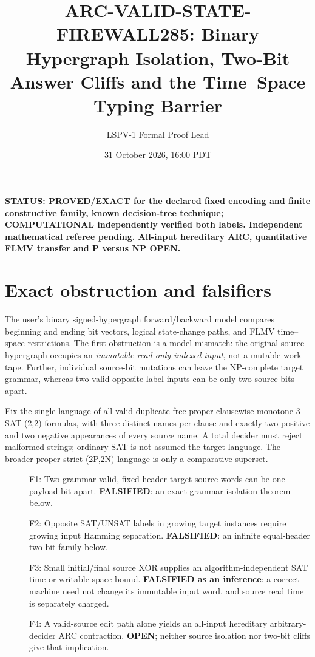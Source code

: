 \documentclass[11pt]{article}
\title{ARC-VALID-STATE-FIREWALL285: Binary Hypergraph Isolation, Two-Bit Answer Cliffs and the Time--Space Typing Barrier}
\author{LSPV-1 Formal Proof Lead}
\date{31 October 2026, 16:00 PDT}
\begin{document}
\maketitle
\noindent\textbf{STATUS: PROVED/EXACT for the declared fixed encoding and finite constructive family, known decision-tree technique; COMPUTATIONAL independently verified both labels. Independent mathematical referee pending. All-input hereditary ARC, quantitative FLMV transfer and P versus NP OPEN.}

\section{Exact obstruction and falsifiers}
The user's binary signed-hypergraph forward/backward model compares beginning and ending bit vectors, logical state-change paths, and FLMV time--space restrictions. The first obstruction is a model mismatch: the original source hypergraph occupies an \emph{immutable read-only indexed input}, not a mutable work tape. Further, individual source-bit mutations can leave the NP-complete target grammar, whereas two valid opposite-label inputs can be only two source bits apart.

Fix the single language of all valid duplicate-free proper clausewise-monotone 3-SAT-(2,2) formulas, with three distinct names per clause and exactly two positive and two negative appearances of every source name. A total decider must reject malformed strings; ordinary SAT is not assumed the target language. The broader proper strict-(2P,2N) language is only a comparative superset.

\begin{description}
\item[] F1: Two grammar-valid, fixed-header target source words can be one payload-bit apart. \textbf{FALSIFIED}: an exact grammar-isolation theorem below.
\item[] F2: Opposite SAT/UNSAT labels in growing target instances require growing input Hamming separation. \textbf{FALSIFIED}: an infinite equal-header two-bit family below.
\item[] F3: Small initial/final source XOR supplies an algorithm-independent SAT time or writable-space bound. \textbf{FALSIFIED as an inference}: a correct machine need not change its immutable input word, and source read time is separately charged.
\item[] F4: A valid-source edit path alone yields an all-input hereditary arbitrary-decider ARC contraction. \textbf{OPEN}; neither source isolation nor two-bit cliffs give that implication.
\end{description}
\end{document}
